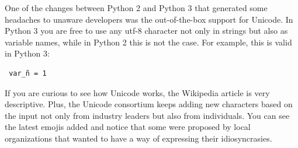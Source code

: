 One of the changes between Python 2 and Python 3 that generated some headaches 
to unaware developers was the out-of-the-box support for Unicode. In Python 3 
you are free to use any utf-8 character not only in strings but also as 
variable names, while in Python 2 this is not the case. For example, this is 
valid in Python 3:

\begin{verbatim}
 var_ñ = 1
\end{verbatim}

If you are curious to see how Unicode works, the Wikipedia article is very descriptive. Plus, the Unicode consortium keeps adding new characters based on the input not only from industry leaders but also from individuals. You can see the latest emojis added and notice that some were proposed by local organizations that wanted to have a way of expressing their idiosyncrasies. 
